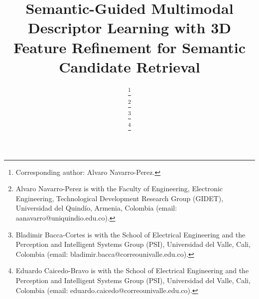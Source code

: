 \title{Semantic-Guided Multimodal Descriptor Learning with 3D Feature Refinement for Semantic Candidate Retrieval}

\author{

        \thanks{Corresponding author: Alvaro Navarro-Perez.}

        \thanks{Alvaro Navarro-Perez is with the Faculty of Engineering, Electronic Engineering, Technological Development Research Group (GIDET), Universidad del Quindío, Armenia, Colombia (email: aanavarro@uniquindio.edu.co).} 

        \thanks{Bladimir Bacca-Cortes is with the School of Electrical Engineering and the Perception and Intelligent Systems Group (PSI), Universidad del Valle, Cali, Colombia (email: bladimir.bacca@correounivalle.edu.co).}

        \thanks{Eduardo Caicedo-Bravo is with the School of Electrical Engineering and the Perception and Intelligent Systems Group (PSI), Universidad del Valle, Cali, Colombia (email: eduardo.caicedo@correounivalle.edu.co).}      
}
